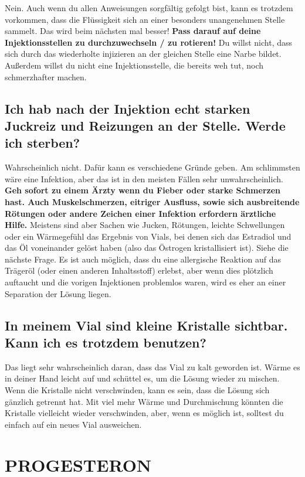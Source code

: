 \documentclass{article}
\begin{document}
Nein. Auch wenn du allen Anweisungen sorgfältig gefolgt bist, kann es trotzdem vorkommen, dass die Flüssigkeit sich an einer besonders unangenehmen Stelle sammelt. Das wird beim nächsten mal besser! \textbf{Pass darauf auf deine Injektionsstellen zu durchzuwechseln / zu rotieren!} Du willst nicht, dass sich durch das wiederholte injizieren an der gleichen Stelle eine Narbe bildet. Außerdem willst du nicht eine Injektionsstelle, die bereits weh tut, noch schmerzhafter machen.

\subsection{Ich hab nach der Injektion echt starken Juckreiz und Reizungen an der Stelle. Werde ich sterben?}

Wahrscheinlich nicht. Dafür kann es verschiedene Gründe geben. Am schlimmsten wäre eine Infektion, aber das ist in den meisten Fällen sehr unwahrscheinlich. \textbf{Geh sofort zu einem Ärzty wenn du Fieber oder starke Schmerzen hast. Auch Muskelschmerzen, eitriger Ausfluss, sowie sich ausbreitende Rötungen oder andere Zeichen einer Infektion erfordern ärztliche Hilfe. } Meistens sind aber Sachen wie Jucken, Rötungen, leichte Schwellungen oder ein Wärmegefühl das Ergebnis von Vials, bei denen sich das Estradiol und das Öl voneinander gelöst haben (also das Östrogen kristallisiert ist). Siehe die nächste Frage. Es ist auch möglich, dass du eine allergische Reaktion auf das Trägeröl (oder einen anderen Inhaltsstoff) erlebst, aber wenn dies plötzlich auftaucht und die vorigen Injektionen problemlos waren, wird es eher an einer Separation der Lösung liegen.

\subsection{In meinem Vial sind kleine Kristalle sichtbar. Kann ich es trotzdem benutzen?}

Das liegt sehr wahrscheinlich daran, dass das Vial zu kalt geworden ist. Wärme es in deiner Hand leicht auf und schüttel es, um die Lösung wieder zu mischen. Wenn die Kristalle nicht verschwinden, kann es sein, dass die Lösung sich gänzlich getrennt hat. Mit viel mehr Wärme und Durchmischung könnten die Kristalle vielleicht wieder verschwinden, aber, wenn es möglich ist, solltest du einfach auf ein neues Vial ausweichen.

 

\section{PROGESTERON}
\end{document}
